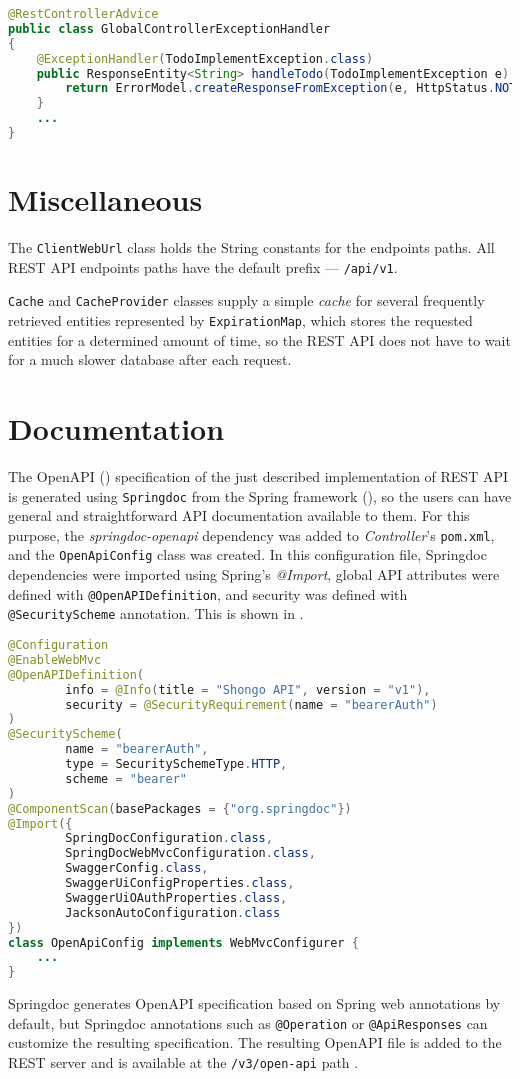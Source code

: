 \begin{lstlisting}[language=java, caption=GlobalControllerExceptionHandler.java, label=lst:err]
@RestControllerAdvice
public class GlobalControllerExceptionHandler
{
    @ExceptionHandler(TodoImplementException.class)
    public ResponseEntity<String> handleTodo(TodoImplementException e) {
        return ErrorModel.createResponseFromException(e, HttpStatus.NOT_IMPLEMENTED);
    }
    ...
}
\end{lstlisting}


\section{Miscellaneous}
The \texttt{ClientWebUrl} class holds the String constants for the endpoints paths. All REST API endpoints paths have the default prefix --- \texttt{/api/v1}.

\texttt{Cache} and \texttt{CacheProvider} classes supply a simple \emph{cache} for several frequently retrieved entities represented by \texttt{ExpirationMap}, which stores the requested entities for a determined amount of time, so the REST API does not have to wait for a much slower database after each request.


\section{Documentation}
The OpenAPI () specification of the just described implementation of REST API is generated using \texttt{Springdoc} from the Spring framework (), so the users can have general and straightforward API documentation available to them.
For this purpose, the \emph{springdoc-openapi} dependency was added to \emph{Controller}'s \texttt{pom.xml}, and the \texttt{OpenApiConfig} class was created. In this configuration file, Springdoc dependencies were imported using Spring's \emph{@Import}, global API attributes were defined with \texttt{@OpenAPIDefinition}, and security was defined with \texttt{@SecurityScheme} annotation.
This is shown in .
\begin{lstlisting}[language=Java, caption=OpenApiConfig.java, label=lst:openapiconf]
@Configuration
@EnableWebMvc
@OpenAPIDefinition(
        info = @Info(title = "Shongo API", version = "v1"),
        security = @SecurityRequirement(name = "bearerAuth")
)
@SecurityScheme(
        name = "bearerAuth",
        type = SecuritySchemeType.HTTP,
        scheme = "bearer"
)
@ComponentScan(basePackages = {"org.springdoc"})
@Import({
        SpringDocConfiguration.class,
        SpringDocWebMvcConfiguration.class,
        SwaggerConfig.class,
        SwaggerUiConfigProperties.class,
        SwaggerUiOAuthProperties.class,
        JacksonAutoConfiguration.class
})
class OpenApiConfig implements WebMvcConfigurer {
    ...
}
\end{lstlisting}
Springdoc generates OpenAPI specification based on Spring web annotations by default, but Springdoc annotations such as \texttt{@Operation} or \texttt{@ApiResponses} can customize the resulting specification.
The resulting OpenAPI file is added to the REST server and is available at the \texttt{/v3/open-api} path \cite{springdoc}.


